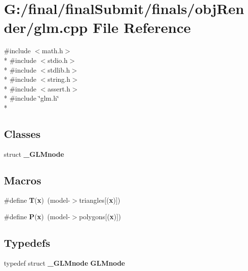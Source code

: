 \section{G\-:/final/final\-Submit/finals/obj\-Render/glm.cpp File Reference}
\label{glm_8cpp}
{\ttfamily \#include $<$math.\-h$>$}\\*
{\ttfamily \#include $<$stdio.\-h$>$}\\*
{\ttfamily \#include $<$stdlib.\-h$>$}\\*
{\ttfamily \#include $<$string.\-h$>$}\\*
{\ttfamily \#include $<$assert.\-h$>$}\\*
{\ttfamily \#include \char`\"{}glm.\-h\char`\"{}}\\*
\subsection*{Classes}
\begin{DoxyCompactItemize}
\item 
struct {\bf \-\_\-\-G\-L\-Mnode}
\end{DoxyCompactItemize}
\subsection*{Macros}
\begin{DoxyCompactItemize}
\item 
\#define {\bf T}({\bf x})~(model-\/$>$triangles[({\bf x})])
\item 
\#define {\bf P}({\bf x})~(model-\/$>$polygons[({\bf x})])
\end{DoxyCompactItemize}
\subsection*{Typedefs}
\begin{DoxyCompactItemize}
\item 
typedef struct {\bf \-\_\-\-G\-L\-Mnode} {\bf G\-L\-Mnode}
\end{DoxyCompactItemize}
